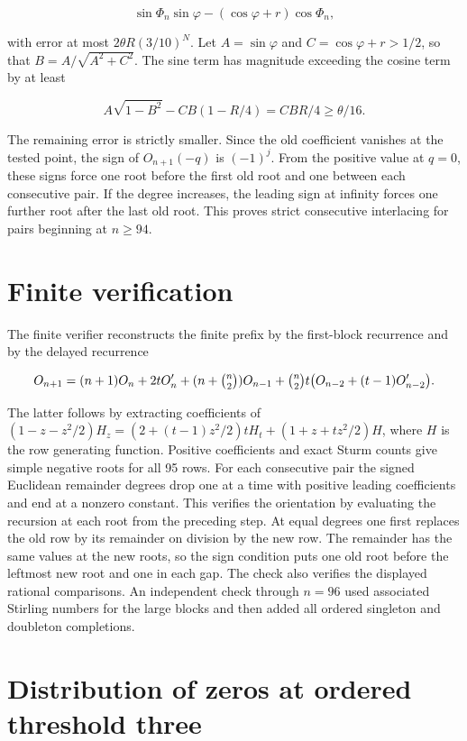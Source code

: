 \documentclass[11pt]{article}
\begin{document}
\[
\sin\Phi_n\sin\varphi-(\cos\varphi+r)\cos\Phi_n,
\]

with error at most $2\theta R(3/10)^N$. Let $A=\sin\varphi$ and $C=\cos\varphi+r>1/2$, so that $B=A/\sqrt{A^2+C^2}$. The sine term has magnitude exceeding the cosine term by at least

\[
A\sqrt{1-B^2}-CB(1-R/4)=CBR/4\ge\theta/16.
\]

The remaining error is strictly smaller. Since the old coefficient vanishes at the tested point, the sign of $O_{n+1}(-q)$ is $(-1)^j$. From the positive value at $q=0$, these signs force one root before the first old root and one between each consecutive pair. If the degree increases, the leading sign at infinity forces one further root after the last old root. This proves strict consecutive interlacing for pairs beginning at $n\ge94$.

\section{Finite verification}

The finite verifier reconstructs the finite prefix by the first-block recurrence and by the delayed recurrence

\[
O_{n+1}=(n+1)O_n+2t O_n'+(n+\tbinom n2)O_{n-1}
 +\tbinom n2 t\bigl(O_{n-2}+(t-1)O'_{n-2}\bigr).
\]

The latter follows by extracting coefficients of $(1-z-z^2/2)H_z=(2+(t-1)z^2/2)tH_t+(1+z+t z^2/2)H$, where $H$ is the row generating function. Positive coefficients and exact Sturm counts give simple negative roots for all 95 rows. For each consecutive pair the signed Euclidean remainder degrees drop one at a time with positive leading coefficients and end at a nonzero constant. This verifies the orientation by evaluating the recursion at each root from the preceding step. At equal degrees one first replaces the old row by its remainder on division by the new row. The remainder has the same values at the new roots, so the sign condition puts one old root before the leftmost new root and one in each gap. The check also verifies the displayed rational comparisons. An independent check through $n=96$ used associated Stirling numbers for the large blocks and then added all ordered singleton and doubleton completions.

\section{Distribution of zeros at ordered threshold three}
\end{document}
